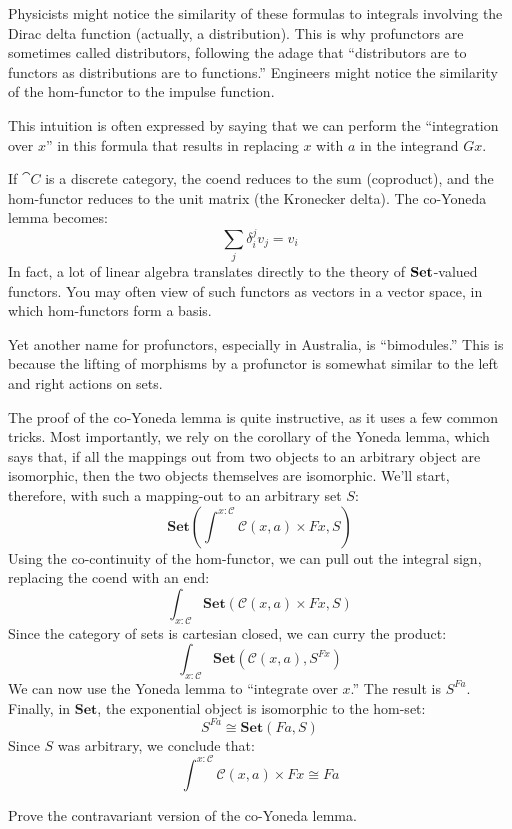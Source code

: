 \documentclass[DaoFP]{subfiles}
\begin{document}
Physicists might notice the similarity of these formulas to integrals involving the Dirac delta function (actually, a distribution). This is why profunctors are sometimes called distributors, following the adage that ``distributors are to functors as distributions are to functions.'' Engineers might notice the similarity of the hom-functor to the impulse function.

This intuition is often expressed by saying that we can perform the ``integration over $x$'' in this formula that results in replacing $x$ with $a$ in the integrand $G x$. 

If $\cat C$ is a discrete category, the coend reduces to the sum (coproduct), and the hom-functor reduces to the unit matrix (the Kronecker delta). The co-Yoneda lemma becomes:
\[ \sum_j \delta_i^j v_j = v_i \]
In fact, a lot of linear algebra translates directly to the theory of $\mathbf{Set}$-valued functors. You may often view of such functors as vectors in a vector space, in which hom-functors form a basis.

Yet another name for profunctors, especially in Australia, is ``bimodules.'' This is because the lifting of morphisms by a profunctor is somewhat similar to the left and right actions on sets. 

The proof of the co-Yoneda lemma is quite instructive, as it uses a few common tricks. Most importantly, we rely on the corollary of the Yoneda lemma, which says that, if all the mappings out from two objects to an arbitrary object are isomorphic, then the two objects themselves are isomorphic. We'll start, therefore, with such a mapping-out to an arbitrary set $S$:
\[ \mathbf{Set} \left(\int^{x \colon \mathcal{C}} \mathcal{C}(x, a) \times F x, S \right) \]
Using the co-continuity of the hom-functor, we can pull out the integral sign, replacing the coend with an end:
\[ \int_{x \colon \mathcal{C}} \mathbf{Set} \left( \mathcal{C}(x, a) \times F x, S \right) \]
Since the category of sets is cartesian closed, we can curry the product:
\[ \int_{x \colon \mathcal{C}} \mathbf{Set} \left( \mathcal{C}(x, a) , S^{F x} \right) \]
We can now use the Yoneda lemma to ``integrate over $x$.'' The result is $S^{F a}$. Finally, in $\mathbf{Set}$, the exponential object is isomorphic to the hom-set:
\[S^{F a} \cong \mathbf{Set}(F a, S)\]
Since $S$ was arbitrary, we conclude that:
\[ \int^{x \colon \mathcal{C}} \mathcal{C}(x, a) \times F x \cong F a \]

\begin{exercise}
Prove the contravariant version of the co-Yoneda lemma.
\end{exercise}
\end{document}

